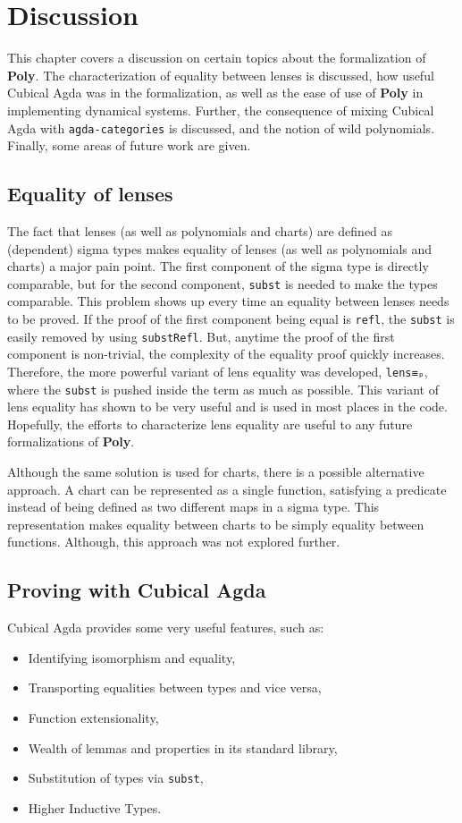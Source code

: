 \chapter{Discussion}\label{chapter:discussion}
This chapter covers a discussion on certain topics about the formalization of \textbf{Poly}. The characterization of equality between lenses is discussed, how useful Cubical Agda was in the formalization, as well as the ease of use of \textbf{Poly} in implementing dynamical systems. Further, the consequence of mixing Cubical Agda with \texttt{agda-categories} is discussed, and the notion of wild polynomials. Finally, some areas of future work are given.

\section{Equality of lenses}
The fact that lenses (as well as polynomials and charts) are defined as (dependent) sigma types makes equality of lenses (as well as polynomials and charts) a major pain point. The first component of the sigma type is directly comparable, but for the second component, \texttt{subst} is needed to make the types comparable. This problem shows up every time an equality between lenses needs to be proved. If the proof of the first component being equal is \texttt{refl}, the \texttt{subst} is easily removed by using \texttt{substRefl}. But, anytime the proof of the first component is non-trivial, the complexity of the equality proof quickly increases. Therefore, the more powerful variant of lens equality was developed, \texttt{lens≡ₚ}, where the \texttt{subst} is pushed inside the term as much as possible. This variant of lens equality has shown to be very useful and is used in most places in the code.
Hopefully, the efforts to characterize lens equality are useful to any future formalizations of \textbf{Poly}.

Although the same solution is used for charts, there is a possible alternative approach.
A chart can be represented as a single function, satisfying a predicate instead of being defined as two different maps in a sigma type.
This representation makes equality between charts to be simply equality between functions. Although, this approach was not explored further.

\section{Proving with Cubical Agda}
Cubical Agda provides some very useful features, such as:
\begin{itemize}
    \item Identifying isomorphism and equality,
    \item Transporting equalities between types and vice versa,
    \item Function extensionality,
    \item Wealth of lemmas and properties in its standard library,
    \item Substitution of types via \texttt{subst},
    \item Higher Inductive Types.
\end{itemize}

